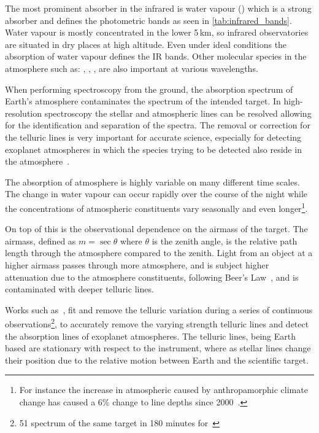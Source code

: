 

The most prominent absorber in the infrared is water vapour () which is a strong absorber and defines the photometric bands as seen in \cref{tab:infrared_bands}.
Water vapour is mostly concentrated in the lower 5\,\si{\kilo\metre}, so infrared observatories are situated in dry places at high altitude.
Even under ideal conditions the absorption of water vapour defines the IR bands.
Other molecular species in the atmosphere such as: , , , are also important at various wavelengths.

When performing spectroscopy from the ground, the absorption spectrum of Earth's atmosphere contaminates the spectrum of the intended target.
In high-resolution spectroscopy the stellar and atmospheric lines can be resolved allowing for the identification and separation of the spectra.
The removal or correction for the telluric lines is very important for accurate science, especially for detecting exoplanet atmospheres in which the species trying to be detected also reside in the atmosphere~\citep{snellen_orbital_2010, brogi_carbon_2014, dekok_detection_2013}.

The absorption of atmosphere is highly variable on many different time scales.
The change in water vapour can occur rapidly over the course of the night while the concentrations of atmospheric constituents vary seasonally and even longer\footnote{For instance the increase in atmospheric  caused by anthropamorphic climate change has caused a 6\% change to  line depths since 2000~\citep{smette_molecfit_2015}.}.

On top of this is the observational dependence on the airmass of the target.
The airmass, defined as $m=\sec{\theta}$ where $\theta$ is the zenith angle, is the relative path length through the atmosphere compared to the zenith.
Light from an object at a higher airmass passes through more atmosphere, and is subject higher attenuation due to the atmosphere constituents, following Beer's Law~\citep{beer_bestimmung_1852}, and is contaminated with deeper telluric lines.

Works such as~\citet{snellen_orbital_2010}, fit and remove the telluric variation during a series of continuous observations\footnote{51 spectrum of the same target in 180 minutes for~\citet{snellen_orbital_2010}}, to accurately remove the varying strength telluric lines and detect the absorption lines of exoplanet atmospheres.
The telluric lines, being Earth based are stationary with respect to the instrument, where as stellar lines change their position due to the relative motion between Earth and the scientific target.
